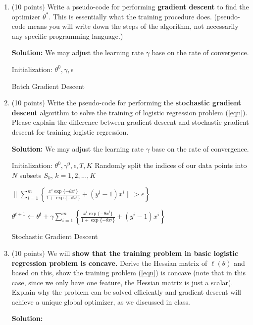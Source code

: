 \documentclass[twoside,10pt]{article}
\begin{document}
\begin{enumerate}
\begin{enumerate}
\item (10 points) Write a pseudo-code  for performing {\bf gradient descent} to find the optimizer $\theta^*$. This is essentially what the training procedure does. (pseudo-code  means you will write down the steps of the algorithm, not necessarily any specific programming language.)
\begin{tcolorbox}
\textbf{Solution:} We may adjust the learning rate $\gamma$ base on the rate of convergence. \\
\begin{algorithm}[H]
 \KwResult{${\theta^*}$}
 Initialization: $\theta^0, \gamma, \epsilon$\;
 \caption{Batch Gradient Descent}
\end{algorithm}
\end{tcolorbox}

\item (10 points) Write the pseudo-code for performing the {\bf stochastic gradient descent} algorithm to solve the training of logistic regression problem (\ref{eqn}). Please explain the difference between gradient descent and stochastic gradient descent for training logistic regression.
\begin{tcolorbox}
\textbf{Solution:} We may adjust the learning rate $\gamma$ base on the rate of convergence. \\
\begin{algorithm}[H]
 \KwResult{${\theta^*}$}
 Initialization: $\theta^0, \gamma^0, \epsilon, T, K$\;
 Randomly split the indices of our data points into $N$ subsets $S_k$, $k = 1, 2, ..., K$  \;
 
 
 \Do
 {   
  $\| \sum_{i=1}^m  \left\{ \frac{x^i\exp\{-\theta x^i\}} {1+\exp\{-\theta x^i\}} + (y^i-1)x^i \| > \epsilon\right\} $}
 
  
  {
      {$\theta^{t+1} \leftarrow  \theta^t + \gamma \sum_{i=1}^m  \left\{ \frac{x^i\exp\{-\theta x^i\}} {1+\exp\{-\theta x^i\}} + (y^i-1)x^i\right\}$\;}
 }
 
 \caption{Stochastic Gradient Descent}
\end{algorithm}
\end{tcolorbox}

\item (10 points) We will {\bf show that the training problem in basic logistic regression problem is concave.} Derive the Hessian matrix of $\ell(\theta)$ and based on this, show the training problem (\ref{eqn}) is concave (note that in this case, since we only have one feature, the Hessian matrix is just a scalar). Explain why the problem can be solved efficiently and gradient descent will achieve a unique global optimizer, as we discussed in class. 
\begin{tcolorbox}
\textbf{Solution:}
\end{tcolorbox}


\end{enumerate}
\end{enumerate}
\end{document}
